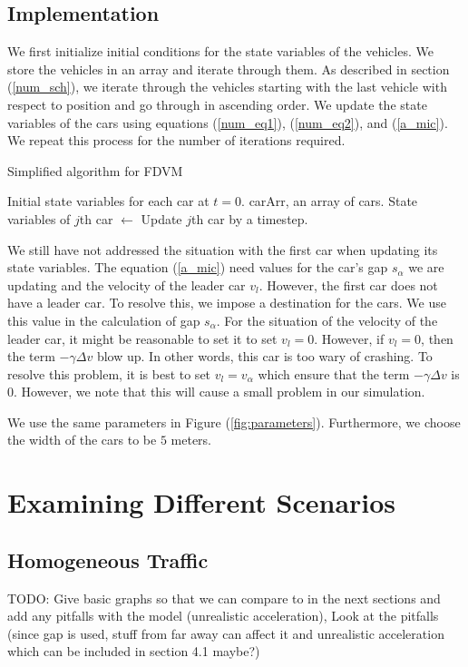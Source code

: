 \documentclass[12pt]{article}
\begin{document}
    \subsection{Implementation}\label{sec:implementation}
    We first initialize initial conditions for the state variables of the vehicles. We store the vehicles in an array and iterate through them. As described in section (\ref{num_sch}), we iterate through the vehicles starting with the last vehicle with respect to position and go through in ascending order. We update the state variables of the cars using equations (\ref{num_eq1}), (\ref{num_eq2}), and (\ref{a_mic}). We repeat this process for the number of iterations required. 
    \begin{algorithm}
      \caption{Simplified algorithm for FDVM}\label{alg:car-following}
      \begin{algorithmic}
      \Require Initial state variables for each car at $t=0$. 
      \Require carArr, an array of cars.
        \State State variables of $j$th car $\gets$ Update $j$th car by a timestep.
        \EndFor
      \EndFor
      \end{algorithmic}
      \end{algorithm}
    We still have not addressed the situation with the first car when updating its state variables. The equation (\ref{a_mic}) need values for the car's gap $s_\alpha$ we are updating and the velocity of the leader car $v_l$. However, the first car does not have a leader car. To resolve this, we impose a destination for the cars. We use this value in the calculation of gap $s_\alpha$. For the situation of the velocity of the leader car, it might be reasonable to set it to set $v_l = 0$. However, if $v_l=0$, then the term $-\gamma \Delta v$ blow up. In other words, this car is too wary of crashing. To resolve this problem, it is best to set $v_l = v_\alpha$ which ensure that the term $-\gamma \Delta v$ is $0$. However, we note that this will cause a small problem in our simulation. 
    
    We use the same parameters in Figure (\ref{fig:parameters}). Furthermore, we choose the width of the cars to be $5$ meters.
    \section{Examining Different Scenarios}
    \subsection{Homogeneous Traffic}
    TODO: Give basic graphs so that we can compare to in the next sections and add any pitfalls with the model (unrealistic acceleration), Look at the pitfalls (since gap is used, stuff from far away can affect it and unrealistic acceleration which can be included in section 4.1 maybe?)
\end{document}
